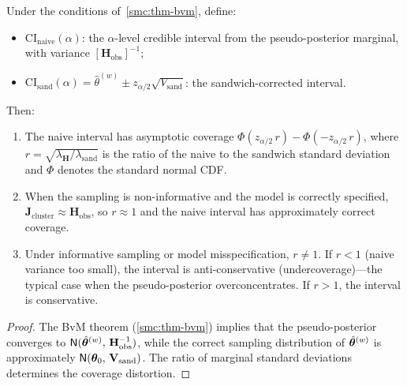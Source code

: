 \begin{corollary}
\label{smc:cor-coverage}
  Under the conditions of~\cref{smc:thm-bvm}, define\textup{:}
  \begin{itemize}[nosep]
    \item $\mathrm{CI}_{\mathrm{naive}}(\alpha)$\textup{:} the
      $\alpha$-level credible interval from the pseudo-posterior
      marginal, with variance
      $[\mathbf{H}_{\mathrm{obs}}]^{-1}$\textup{;}
    \item $\mathrm{CI}_{\mathrm{sand}}(\alpha)
      = \hat{\theta}^{(w)} \pm z_{\alpha/2}\sqrt{V_{\mathrm{sand}}}$\textup{:}
      the sandwich-corrected interval.
  \end{itemize}
  Then\textup{:}
  \begin{enumerate}[label=\textup{(\alph*)},nosep]
    \item The naive interval has asymptotic coverage
      $\Phi(z_{\alpha/2}\, r) - \Phi(-z_{\alpha/2}\, r)$, where
      $r = \sqrt{\lambda_{\mathbf{H}} / \lambda_{\mathrm{sand}}}$ is
      the ratio of the naive to the sandwich standard deviation and
      $\Phi$ denotes the standard normal CDF.
    \item When the sampling is non-informative and the model is
      correctly specified, $\mathbf{J}_{\mathrm{cluster}} \approx
      \mathbf{H}_{\mathrm{obs}}$, so $r \approx 1$ and the naive
      interval has approximately correct coverage.
    \item Under informative sampling or model misspecification,
      $r \neq 1$.  If $r < 1$ \textup{(}naive variance too
      small\textup{)}, the interval is anti-conservative
      \textup{(}undercoverage\textup{)}---the typical case when the
      pseudo-posterior overconcentrates.  If $r > 1$, the interval is
      conservative.
  \end{enumerate}
\end{corollary}

\begin{proof}
  The BvM theorem (\cref{smc:thm-bvm}) implies that the
  pseudo-posterior converges to
  $\textsf{N}(\hat{\boldsymbol{\theta}}^{(w)},\, \mathbf{H}_{\mathrm{obs}}^{-1})$,
  while the correct sampling distribution of $\hat{\boldsymbol{\theta}}^{(w)}$ is
  approximately $\textsf{N}(\boldsymbol{\theta}_0,\, \mathbf{V}_{\mathrm{sand}})$.
  The ratio of marginal standard deviations determines the coverage
  distortion.
\end{proof}

